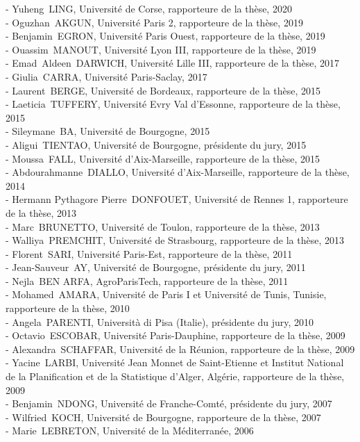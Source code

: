 \documentclass[a4paper,12pt]{article}
\begin{document}
- Yuheng~LING, Université de Corse, rapporteure de la thèse, 2020 \\ 
- Oguzhan~AKGUN, Université Paris 2, rapporteure de la thèse, 2019 \\ 
- Benjamin~EGRON, Université Paris Ouest, rapporteure de la thèse, 2019 \\ 
- Ouassim~MANOUT, Université Lyon III, rapporteure de la thèse, 2019 \\ 
- Emad~Aldeen~DARWICH, Université Lille III, rapporteure de la thèse, 2017 \\ 
- Giulia~CARRA, Université Paris-Saclay, 2017 \\ 
- Laurent~BERGE, Université de Bordeaux, rapporteure de la thèse, 2015 \\ 
- Laeticia~TUFFERY, Université Evry Val d'Essonne, rapporteure de la thèse, 2015 \\ 
- Sileymane~BA, Université de Bourgogne, 2015 \\ 
- Aligui~TIENTAO, Université de Bourgogne, présidente du jury, 2015 \\ 
- Moussa~FALL, Université d'Aix-Marseille, rapporteure de la thèse, 2015 \\ 
- Abdourahmanne~DIALLO, Université d'Aix-Marseille, rapporteure de la thèse, 2014 \\ 
- Hermann Pythagore Pierre~DONFOUET, Université de Rennes 1, rapporteure de la thèse, 2013 \\ 
- Marc~BRUNETTO, Université de Toulon, rapporteure de la thèse, 2013 \\ 
- Walliya~PREMCHIT, Université de Strasbourg, rapporteure de la thèse, 2013 \\ 
- Florent~SARI, Université Paris-Est, rapporteure de la thèse, 2011 \\ 
- Jean-Sauveur~AY, Université de Bourgogne, présidente du jury, 2011 \\ 
- Nejla~BEN ARFA, AgroParisTech, rapporteure de la thèse, 2011 \\
- Mohamed~AMARA, Université de Paris I et Université de Tunis, Tunisie, rapporteure de la thèse, 2010 \\
- Angela~PARENTI, Università di Pisa (Italie), présidente du jury, 2010 \\ 
- Octavio~ESCOBAR, Université Paris-Dauphine, rapporteure de la thèse, 2009 \\
- Alexandra~SCHAFFAR, Université de la Réunion, rapporteure de la thèse, 2009 \\ 
- Yacine~LARBI, Université Jean Monnet de Saint-Etienne et Institut National de la Planification et de la Statistique d'Alger, Algérie, rapporteure de la thèse, 2009 \\ 
- Benjamin~NDONG, Université de Franche-Comté, présidente du jury, 2007 \\
- Wilfried~KOCH, Université de Bourgogne, rapporteure de la thèse, 2007 \\
- Marie~LEBRETON, Université de la Méditerranée, 2006 \\
\end{document}
